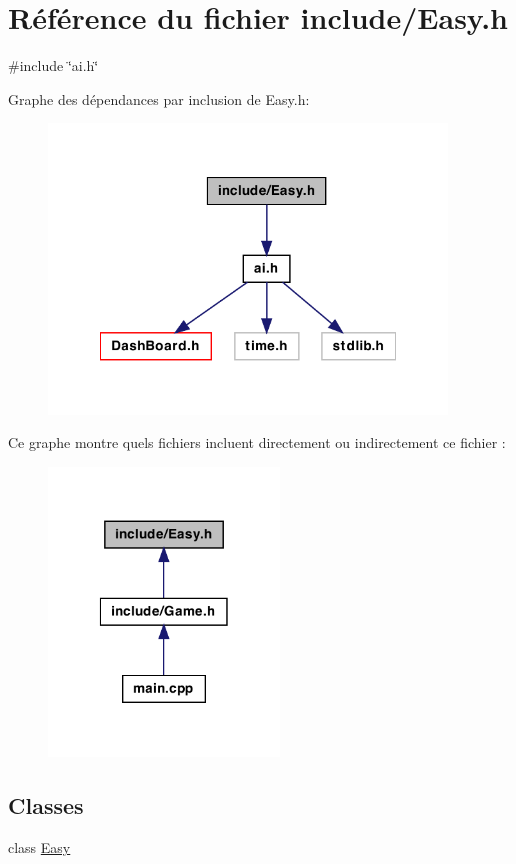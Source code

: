 \hypertarget{a00023}{
\section{Référence du fichier include/Easy.h}
\label{a00023}
}
{\ttfamily \#include \char`\"{}ai.h\char`\"{}}\par
Graphe des dépendances par inclusion de Easy.h:
\nopagebreak
\begin{figure}[H]
\begin{center}
\leavevmode
\includegraphics[width=300pt]{a00050}
\end{center}
\end{figure}
Ce graphe montre quels fichiers incluent directement ou indirectement ce fichier :
\nopagebreak
\begin{figure}[H]
\begin{center}
\leavevmode
\includegraphics[width=174pt]{a00051}
\end{center}
\end{figure}
\subsection*{Classes}
\begin{DoxyCompactItemize}
\item 
class \hyperlink{a00007}{Easy}
\end{DoxyCompactItemize}
